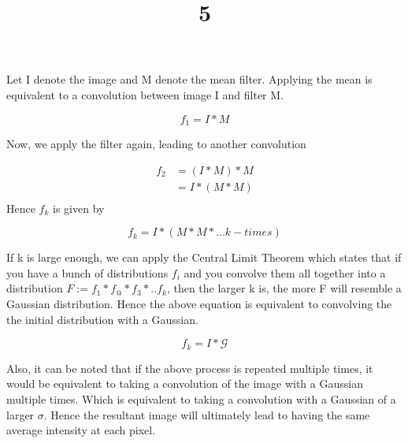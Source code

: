 \documentclass[a4paper]{article}
\title{5}
\date{}
\begin{document}
\maketitle

Let I denote the image and M denote the mean filter. Applying the mean is equivalent to a convolution between image I and filter M. 

\begin{equation}
    f_1 = I * M 
\end{equation}

Now, we apply the filter again, leading to another convolution

\begin{align}
     f_2 & = (I*M)*M \\
         & = I*(M*M) \\
\end{align}
Hence $f_k$ is given by

\begin{equation}
    f_k = I*(M*M*...k-times)
\end{equation}

If k is large enough, we can apply the Central Limit Theorem which states that if you have a bunch of distributions $f_i$ and you convolve them all together into a distribution $F:= f_1*f_@*f_3*..f_k$, then the larger k is, the more F will resemble a Gaussian distribution. Hence the above equation is equivalent to convolving the the initial distribution with a Gaussian.

\begin{equation}
    f_k = I*\mathcal{G}
\end{equation}

Also, it can be noted that if the above process is repeated multiple times, it would be equivalent to taking a convolution of the image with a Gaussian multiple times. Which is equivalent to taking a convolution with a Gaussian of a larger $\sigma$. Hence the resultant image will ultimately lead to having the same average intensity at each pixel.
    
\end{document}
